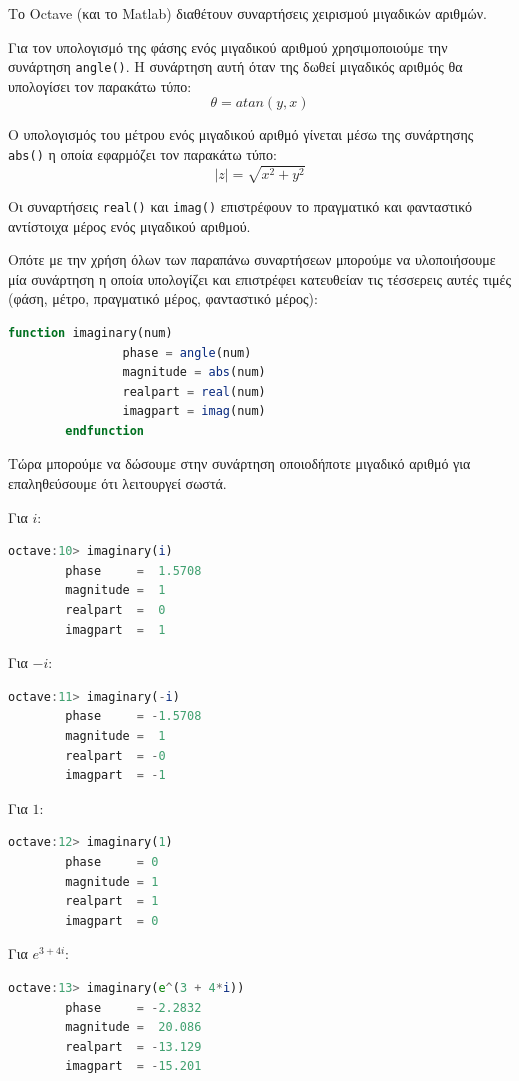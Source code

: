 \documentclass{article}
\begin{document}
Το Octave (και το Matlab) διαθέτουν συναρτήσεις χειρισμού μιγαδικών αριθμών.

Για τον υπολογισμό της φάσης ενός μιγαδικού αριθμού χρησιμοποιούμε την συνάρτηση
\lstinline{angle()}. Η συνάρτηση αυτή όταν της δωθεί μιγαδικός αριθμός θα
υπολογίσει τον παρακάτω τύπο:
\[\theta = atan(y, x)\]

Ο υπολογισμός του μέτρου ενός μιγαδικού αριθμό γίνεται μέσω της συνάρτησης
\lstinline{abs()} η οποία εφαρμόζει τον παρακάτω τύπο:
\[|z| = \sqrt{x^2 + y^2}\]

Οι συναρτήσεις \lstinline{real()} και \lstinline{imag()} επιστρέφουν το πραγματικό
και φανταστικό αντίστοιχα μέρος ενός μιγαδικού αριθμού.

Οπότε με την χρήση όλων των παραπάνω συναρτήσεων μπορούμε να υλοποιήσουμε μία
συνάρτηση η οποία υπολογίζει και επιστρέφει κατευθείαν τις τέσσερεις αυτές
τιμές (φάση, μέτρο, πραγματικό μέρος, φανταστικό μέρος):

\begin{lstlisting}[language=octave]
        function imaginary(num)
                phase = angle(num)
                magnitude = abs(num)
                realpart = real(num)
                imagpart = imag(num)
        endfunction
\end{lstlisting}

Τώρα μπορούμε να δώσουμε στην συνάρτηση οποιοδήποτε μιγαδικό αριθμό για
επαληθεύσουμε ότι λειτουργεί σωστά.

Για $i$:
\begin{lstlisting}[language=octave]
        octave:10> imaginary(i)
        phase     =  1.5708
        magnitude =  1
        realpart  =  0
        imagpart  =  1
\end{lstlisting}

Για $-i$:
\begin{lstlisting}[language=octave]
        octave:11> imaginary(-i)
        phase     = -1.5708
        magnitude =  1
        realpart  = -0
        imagpart  = -1
\end{lstlisting}

Για $1$:
\begin{lstlisting}[language=octave]
        octave:12> imaginary(1)
        phase     = 0
        magnitude = 1
        realpart  = 1
        imagpart  = 0
\end{lstlisting}

Για $e^{3 + 4i}$:
\begin{lstlisting}[language=octave]
        octave:13> imaginary(e^(3 + 4*i))
        phase     = -2.2832
        magnitude =  20.086
        realpart  = -13.129
        imagpart  = -15.201
\end{lstlisting}
\end{document}
